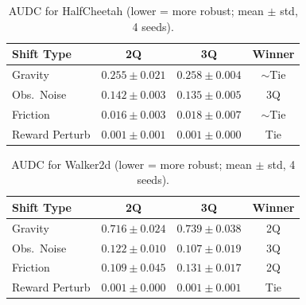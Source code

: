 \documentclass[conference]{IEEEtran}
\begin{document}
\begin{table}[t]
  \centering
  \caption{AUDC for HalfCheetah (lower = more robust; mean $\pm$ std, 4 seeds).}
  \label{tab:audc-halfcheetah}
  \begin{tabular}{lccc}
    \toprule
    Shift Type     & 2Q              & 3Q              & Winner \\
    \midrule
    Gravity        & $0.255\pm0.021$ & $0.258\pm0.004$ & $\sim$Tie \\
    Obs.\ Noise    & $0.142\pm0.003$ & $0.135\pm0.005$ & 3Q \\
    Friction       & $0.016\pm0.003$ & $0.018\pm0.007$ & $\sim$Tie \\
    Reward Perturb & $0.001\pm0.001$ & $0.001\pm0.000$ & Tie \\
    \bottomrule
  \end{tabular}
\end{table}

\begin{table}[t]
  \centering
  \caption{AUDC for Walker2d (lower = more robust; mean $\pm$ std, 4 seeds).}
  \label{tab:audc-walker}
  \begin{tabular}{lccc}
    \toprule
    Shift Type     & 2Q              & 3Q              & Winner \\
    \midrule
    Gravity        & $0.716\pm0.024$ & $0.739\pm0.038$ & 2Q \\
    Obs.\ Noise    & $0.122\pm0.010$ & $0.107\pm0.019$ & 3Q \\
    Friction       & $0.109\pm0.045$ & $0.131\pm0.017$ & 2Q \\
    Reward Perturb & $0.001\pm0.000$ & $0.001\pm0.001$ & Tie \\
    \bottomrule
  \end{tabular}
\end{table}
\end{document}

